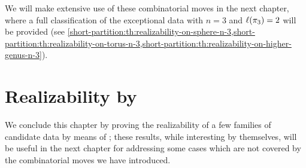 We will make extensive use of these combinatorial moves in the next chapter, where a full classification of the exceptional data with $n=3$ and $\ell(\pi_3)=2$ will be provided (see \cref{short-partition:th:realizability-on-sphere-n-3,short-partition:th:realizability-on-torus-n-3,short-partition:th:realizability-on-higher-genus-n-3}).

\section{Realizability by \texorpdfstring{\dessins{}}{dessins d'enfant}}

We conclude this chapter by proving the realizability of a few families of candidate data by means of \dessins{}; these results, while interesting by themselves, will be useful in the next chapter for addressing some cases which are not covered by the combinatorial moves we have introduced.

